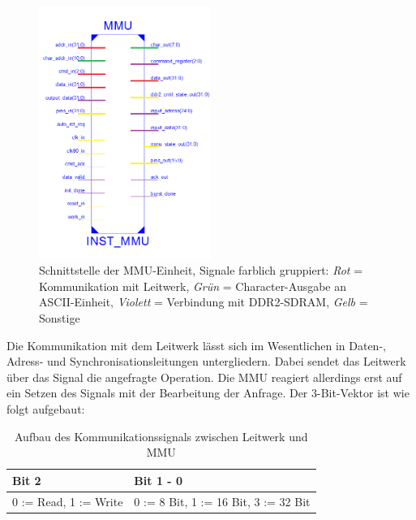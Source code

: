 \begin{figure}[H]
	\centering
		\includegraphics[width=0.5\textwidth]{interface.png}
	\caption[Schnittstelle der MMU-Einheit]{Schnittstelle der MMU-Einheit, Signale farblich gruppiert: \textit{Rot} = Kommunikation mit Leitwerk, \textit{Gr\"un} = Character-Ausgabe an ASCII-Einheit, \textit{Violett} = Verbindung mit DDR2-SDRAM, \textit{Gelb} = Sonstige}
	\label{fig:mmuinterface}
\end{figure}


Die Kommunikation mit dem Leitwerk l\"asst sich im Wesentlichen in Daten-, Adress- und Synchronisationsleitungen untergliedern. Dabei sendet das Leitwerk \"uber das Signal  die angefragte Operation. Die MMU reagiert allerdings erst auf ein Setzen des  Signals mit der Bearbeitung der Anfrage. Der 3-Bit-Vektor  ist wie folgt aufgebaut:

	\begin{table}
\begin{center}

	\begin{tabular}{| l | l |}
		\hline
		Bit 2 & Bit 1 - 0 \\ \hline
		0 := Read, 1 := Write & 0 := 8 Bit, 1 := 16 Bit, 3 := 32 Bit \\ 		\hline
	\end{tabular}
	\caption{Aufbau des Kommunikationssignals zwischen Leitwerk und MMU}
\end{center}
\end{table}


